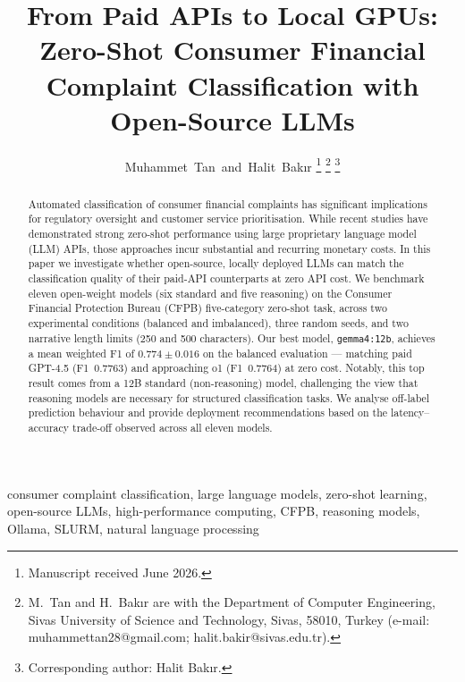 \documentclass[journal]{IEEEtran}
\begin{document}
\title{From Paid APIs to Local GPUs: Zero-Shot Consumer Financial\\
Complaint Classification with Open-Source LLMs}

\author{Muhammet~Tan~and~Halit~Bak{\i}r%
\thanks{Manuscript received June 2026.}%
\thanks{M.~Tan and H.~Bak{\i}r are with the Department of Computer
Engineering, Sivas University of Science and Technology, Sivas, 58010,
Turkey (e-mail: muhammettan28@gmail.com; halit.bakir@sivas.edu.tr).}%
\thanks{Corresponding author: Halit Bak{\i}r.}%
}

\maketitle

\begin{abstract}
Automated classification of consumer financial complaints has significant
implications for regulatory oversight and customer service prioritisation.
While recent studies have demonstrated strong zero-shot performance using
large proprietary language model (LLM) APIs, those approaches incur
substantial and recurring monetary costs. In this paper we investigate
whether open-source, locally deployed LLMs can match the classification
quality of their paid-API counterparts at zero API cost. We benchmark
eleven open-weight models (six standard and five reasoning) on the
Consumer Financial Protection Bureau (CFPB) five-category zero-shot
task, across two experimental conditions (balanced and imbalanced),
three random seeds, and two narrative length limits (250 and 500
characters). Our best model, \texttt{gemma4:12b}, achieves a mean
weighted F1 of $0.774 \pm 0.016$ on the balanced evaluation — matching
paid GPT-4.5 (F1~0.7763) and approaching o1 (F1~0.7764) at zero cost.
Notably, this top result comes from a 12B standard (non-reasoning) model,
challenging the view that reasoning models are necessary for structured
classification tasks. We analyse off-label prediction behaviour and
provide deployment recommendations based on the latency–accuracy
trade-off observed across all eleven models.
\end{abstract}

\begin{IEEEkeywords}
consumer complaint classification, large language models, zero-shot
learning, open-source LLMs, high-performance computing, CFPB,
reasoning models, Ollama, SLURM, natural language processing
\end{IEEEkeywords}
\end{document}
